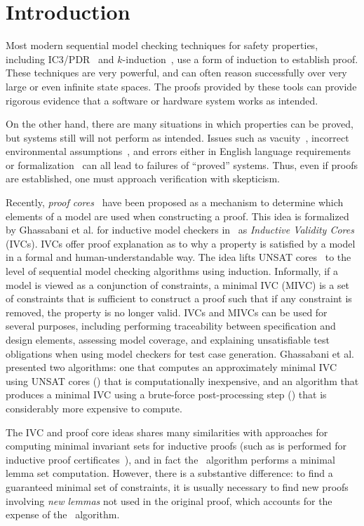 \section{Introduction}
\label{sec:intro}
Most modern sequential model checking techniques for safety properties, including IC3/PDR~\cite{Een2011:PDR} and $k$-induction~\cite{SheeranSS00}, use a form of induction to establish proof.  These techniques are very powerful, and can often reason successfully over very large or even infinite state spaces.  The proofs provided by these tools can provide rigorous evidence that a software or hardware system works as intended.

On the other hand, there are many situations in which properties can be proved, but systems still will not perform as intended.  Issues such as vacuity~\cite{Kupferman03:Vacuity}, incorrect environmental assumptions~\cite{Whalen07:FMICS}, and errors either in English language requirements or formalization~\cite{Pike06:axioms} can all lead to failures of ``proved'' systems.  Thus, even if proofs are established, one must approach verification with skepticism.

Recently, {\em proof cores}~\cite{jasper_gold} have been proposed as a mechanism to determine which elements of a model are used when constructing a proof.  This idea is formalized by Ghassabani et al. for inductive model checkers in~\cite{Ghass16} as {\em Inductive Validity Cores} (IVCs). IVCs offer proof explanation as to why a property is satisfied by a model in a formal and human-understandable way.  The idea lifts UNSAT cores~\cite{zhang2003extracting}
to the level of sequential model checking algorithms using induction.  Informally, if a model is viewed as a conjunction of constraints,
a minimal IVC (MIVC) is a set of constraints that is sufficient to construct a proof such that if any constraint is removed, the property is no longer valid.
%
IVCs and MIVCs can be used for several purposes, including performing traceability between specification and design elements, assessing model coverage, and explaining unsatisfiable test obligations when using model checkers for test case generation. Ghassabani et al.~\cite{Ghass16} presented two algorithms: one that computes an approximately minimal IVC using UNSAT cores (\ucalg) that is computationally inexpensive, and an algorithm that produces a
minimal IVC using a brute-force post-processing step (\ucbfalg) that is considerably more expensive to compute.

The IVC and proof core ideas shares many similarities with approaches for computing minimal invariant sets for inductive proofs (such as is performed for inductive proof certificates~\cite{piskac2016, ivrii2014small}), and in fact the \ucalg\ algorithm performs a minimal lemma set computation.  However, there is a substantive difference: to find a guaranteed minimal set of constraints, it is usually necessary to find new proofs involving {\em new lemmas} not used in the original proof, which accounts for the expense of the \ucbfalg\ algorithm.

